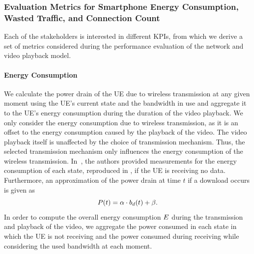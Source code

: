 \subsubsection*{Evaluation Metrics for Smartphone Energy Consumption, Wasted Traffic, and Connection Count}\label{sec:application:lte_video:system_model:model_assumptions:metrics}
Each of the stakeholders is interested in different \glspl{KPI}, from which we derive a set of metrics considered during the performance evaluation of the network and video playback model.

\paragraph*{Energy Consumption}
We calculate the power drain of the \gls{UE} due to wireless transmission at any given moment using the \gls{UE}'s current state and the bandwidth in use and aggregate it to the \gls{UE}'s energy consumption during the duration of the video playback.
We only consider the energy consumption due to wireless transmission, as it is an offset to the energy consumption caused by the playback of the video.
The video playback itself is unaffected by the choice of transmission mechanism.
Thus, the selected transmission mechanism only influences the energy consumption of the wireless transmission.
In~\cite{Huang2012}, the authors provided measurements for the energy consumption of each state, reproduced in , if the \gls{UE} is receiving no data.
Furthermore, an approximation of the power drain at time \(t\) if a download occurs is given as 
\[P(t) =\alpha \cdot b_d(t) + \beta.\]
In order to compute the overall energy consumption \(E\) during the transmission and playback of the video, we aggregate the power consumed in each state in which the \gls{UE} is not receiving and the power consumed during receiving while considering the used bandwidth at each moment.

